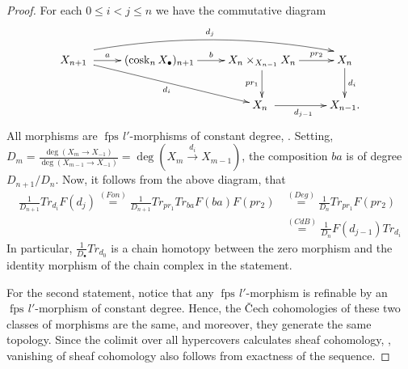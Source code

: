\documentclass[10pt]{amsart}
\newtheorem{lemm}[theo]{Lemma}
\theoremstyle{definition}
\newcommand{\zll}{\mathbb{Z}_{(l)}}
\DeclareMathOperator{\Tr}{Tr}
\DeclareMathOperator{\id}{id}
\DeclareMathOperator{\cosk}{cosk}
\newcommand{\fpsl}{{\operatorname{fps\!}l'}}
\begin{document}
\begin{proof}
For each $0 \leq i < j \leq n$ we have the commutative diagram
\[ \xymatrix{
X_{n+1} \ar[r]^-a \ar[drr]_{d_i} \ar@/^12pt/@<1.5ex>[rrr]^{d_j} & (\cosk_n X_\bullet)_{n+1} \ar[r]^-b & X_n \times_{X_{n-1}} X_n \ar[r]^-{pr_2} \ar[d]_-{pr_1} & X_n \ar[d]^{d_i} \\
&& X_n \ar[r]_{d_{j-1}} & X_{n-1} .
} \]
All morphisms are $\fpsl$-morphisms of constant degree, \cite[\href{https://stacks.math.columbia.edu/tag/01GN}{Tag 01GN}]{Stacks}. Setting, $D_m = \tfrac{\deg(X_m \to X_{-1})}{\deg(X_{m-1} \to X_{-1})} = \deg(X_m \stackrel{d_i}{\to} X_{m-1})$, the composition $ba$ is of degree $D_{n+1}/ D_n$. Now, it follows from the above diagram, that
\begin{align*}
 \tfrac{1}{D_{n+1}} Tr_{d_i} F(d_j) 
 \stackrel{(Fon)}{=} \tfrac{1}{D_{n+1}} Tr_{pr_1} Tr_{ba} F(ba) F(pr_2) 
 &\stackrel{(Deg)}{=} \tfrac{1}{D_{n}} Tr_{pr_1} F(pr_2) 
 \\&\stackrel{(CdB)}{=} \tfrac{1}{D_{n}} F(d_{j-1}) Tr_{d_i}
 \end{align*}
In particular, $\tfrac{1}{D_\bullet} Tr_{d_0}$ is a chain homotopy between the zero morphism and the identity morphism of the chain complex in the statement.

For the second statement, notice that any $\fpsl$-morphism is refinable by an $\fpsl$-morphism of constant degree. Hence, the \v{C}ech cohomologies of these two classes of morphisms are the same, and moreover, they generate the same topology. Since the colimit over all hypercovers calculates sheaf cohomology, \cite[Thm.7.4.1(2)]{SGA42}, vanishing of sheaf cohomology also follows from exactness of the sequence.
\end{proof}

%
\end{document}
